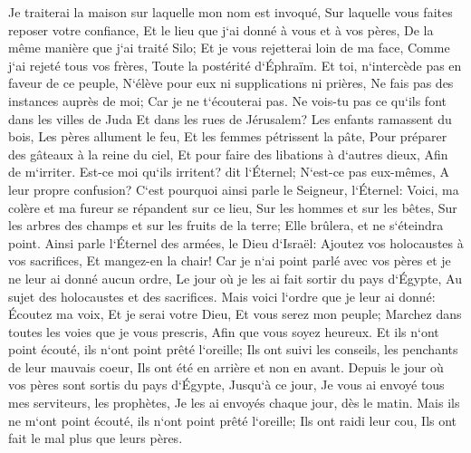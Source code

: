 \verse Je traiterai la maison sur laquelle mon nom est invoqué, Sur laquelle vous faites reposer votre confiance, Et le lieu que j`ai donné à vous et à vos pères, De la même manière que j`ai traité Silo; 
\verse Et je vous rejetterai loin de ma face, Comme j`ai rejeté tous vos frères, Toute la postérité d`Éphraïm. 
\verse Et toi, n`intercède pas en faveur de ce peuple, N`élève pour eux ni supplications ni prières, Ne fais pas des instances auprès de moi; Car je ne t`écouterai pas. 
\verse Ne vois-tu pas ce qu`ils font dans les villes de Juda Et dans les rues de Jérusalem? 
\verse Les enfants ramassent du bois, Les pères allument le feu, Et les femmes pétrissent la pâte, Pour préparer des gâteaux à la reine du ciel, Et pour faire des libations à d`autres dieux, Afin de m`irriter. 
\verse Est-ce moi qu`ils irritent? dit l`Éternel; N`est-ce pas eux-mêmes, A leur propre confusion? 
\verse C`est pourquoi ainsi parle le Seigneur, l`Éternel: Voici, ma colère et ma fureur se répandent sur ce lieu, Sur les hommes et sur les bêtes, Sur les arbres des champs et sur les fruits de la terre; Elle brûlera, et ne s`éteindra point. 
\verse Ainsi parle l`Éternel des armées, le Dieu d`Israël: Ajoutez vos holocaustes à vos sacrifices, Et mangez-en la chair! 
\verse Car je n`ai point parlé avec vos pères et je ne leur ai donné aucun ordre, Le jour où je les ai fait sortir du pays d`Égypte, Au sujet des holocaustes et des sacrifices. 
\verse Mais voici l`ordre que je leur ai donné: Écoutez ma voix, Et je serai votre Dieu, Et vous serez mon peuple; Marchez dans toutes les voies que je vous prescris, Afin que vous soyez heureux. 
\verse Et ils n`ont point écouté, ils n`ont point prêté l`oreille; Ils ont suivi les conseils, les penchants de leur mauvais coeur, Ils ont été en arrière et non en avant. 
\verse Depuis le jour où vos pères sont sortis du pays d`Égypte, Jusqu`à ce jour, Je vous ai envoyé tous mes serviteurs, les prophètes, Je les ai envoyés chaque jour, dès le matin. 
\verse Mais ils ne m`ont point écouté, ils n`ont point prêté l`oreille; Ils ont raidi leur cou, Ils ont fait le mal plus que leurs pères. 
